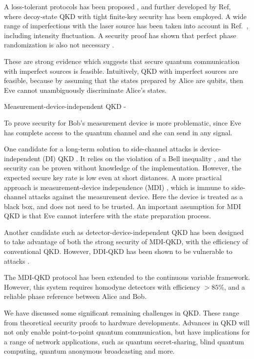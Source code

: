 A loss-tolerant protocols has been proposed \cite{PhysRevA.90.052314}, and further developed by Ref\cite{PhysRevA.92.032305}, where
decoy-state QKD with tight finite-key security has been employed. A wide range of imperfections with the laser source has been taken into account in Ref.~\cite{mizutani2015finite}, including intensity fluctuation.  A security proof has shown that perfect phase randomization is also not necessary \cite{cao2015discrete}.


These are strong evidence which suggests that secure quantum communication with imperfect sources is feasible\cite{diamanti2016practical}. Intuitively, QKD with imperfect sources are feasible, because by assuming that the states prepared by Alice are qubits, then Eve cannot unambiguously discriminate Alice's states\cite{diamanti2016practical}. 



Measurement-device-independent QKD -

To prove security for Bob's measurement device is more problematic, since Eve has complete access to the quantum channel and she can send in any signal. 

One candidate for a long-term solution to side-channel attacks is device-independent (DI) QKD \cite{PhysRevLett.98.230501}. It relies on the violation of a Bell inequality \cite{hensen2015loophole}, and the security can be proven without knowledge of the implementation. However, the expected secure key rate is low even at short distances. A more practical approach is measurement-device independence (MDI) \cite{PhysRevLett.108.130503}, which is immune to side-channel attacks against the measurement device. Here the device is treated as a black box, and does not need to be trusted. An important assumption for MDI QKD is that Eve cannot interfere with the state preparation process. 

Another candidate such as 
detector-device-independent\cite{lim2014detector,PhysRevA.92.022337} QKD has been designed to take advantage of both the strong security of MDI-QKD, with the efficiency of conventional QKD. However, DDI-QKD has been shown to be vulnerable to attacks \cite{PhysRevLett.117.250505}. 

The MDI-QKD protocol has been extended to the continuous variable framework. However, this system requires homodyne detectors with efficiency $> 85\%$, and a reliable phase reference between Alice and Bob.  



We have discussed some significant remaining challenges in QKD.
These range from theoretical security proofs to hardware developments.
Advances in QKD will not only enable point-to-point quantum communication,
but have implications for a range of network applications, such as
quantum secret-sharing\cite{cleve1999share,PhysRevA.61.042311,PhysRevA.71.044301}, blind quantum computing\cite{broadbent2009universal,barz2012demonstration}, quantum anonymous
broadcasting\cite{christandl2005quantum} and more.

